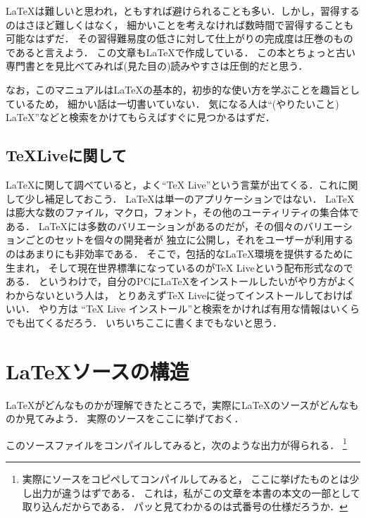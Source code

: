 {\LaTeX}は難しいと思われ，ともすれば避けられることも多い．しかし，習得するのはさほど難しくはなく，
細かいことを考えなければ数時間で習得することも可能なはずだ．
その習得難易度の低さに対して仕上がりの完成度は圧巻のものであると言えよう．
この文章も{\LaTeX}で作成している．
この本とちょっと古い専門書とを見比べてみれば(見た目の)読みやすさは圧倒的だと思う．

なお，このマニュアルは{\LaTeX}の基本的，初歩的な使い方を学ぶことを趣旨としているため，
細かい話は一切書いていない．
気になる人は``(やりたいこと)  LaTeX''などと検索をかけてもらえばすぐに見つかるはずだ．

\subsection{\TeX Liveに関して}
{\LaTeX}に関して調べていると，よく``{TeX Live}''という言葉が出てくる．これに関して少し補足しておこう．
{\LaTeX}は単一のアプリケーションではない．
{\LaTeX}は膨大な数のファイル，マクロ，フォント，その他のユーティリティの集合体である．
{\LaTeX}には多数のバリエーションがあるのだが，その個々のバリエーションごとのセットを個々の開発者が
独立に公開し，それをユーザーが利用するのはあまりにも非効率である．
そこで，包括的な{\LaTeX}環境を提供するために生まれ，
そして現在世界標準になっているのが{TeX Live}という配布形式なのである．
というわけで，自分のPCに{\LaTeX}をインストールしたいがやり方がよくわからないという人は，
とりあえず{TeX Live}に従ってインストールしておけばいい．
やり方は
``TeX Live インストール''と検索をかければ有用な情報はいくらでも出てくるだろう．
いちいちここに書くまでもないと思う．

\section{{\LaTeX}ソースの構造}
{\LaTeX}がどんなものかが理解できたところで，実際に{\LaTeX}のソースがどんなものか見てみよう．
実際のソースをここに挙げておく．


このソースファイルをコンパイルしてみると，次のような出力が得られる．
\footnote{実際にソースをコピペしてコンパイルしてみると，
ここに挙げたものとは少し出力が違うはずである．
これは，私がこの文章を本書の本文の一部として取り込んだからである．
パッと見てわかるのは式番号の仕様だろうか．}

